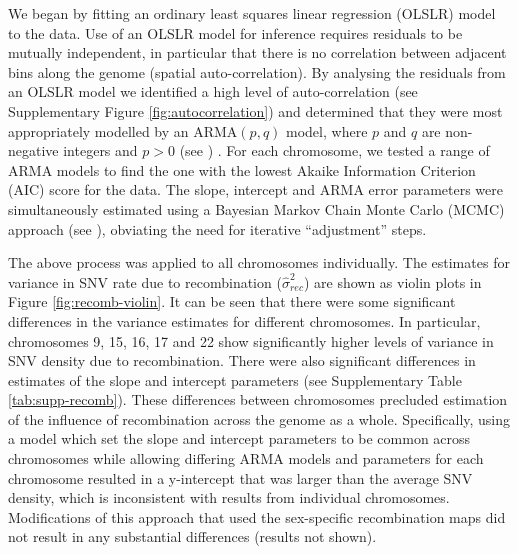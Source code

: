 We began by fitting an ordinary least squares linear regression (OLSLR) model to the data. Use of an OLSLR model for inference requires residuals to be mutually independent, in particular that there is no correlation between adjacent bins along the genome (spatial auto-correlation). By analysing the residuals from an OLSLR model we identified a high level of auto-correlation (see Supplementary Figure \ref{fig:autocorrelation}) and determined that they were most appropriately modelled by an ARMA$(p,q)$ model, where $p$ and $q$ are non-negative integers and $p>0$ (see ) . For each chromosome, we tested a range of ARMA models to find the one with the lowest Akaike Information Criterion (AIC) score for the data. The slope, intercept and ARMA error parameters were simultaneously estimated using a Bayesian Markov Chain Monte Carlo (MCMC) approach (see ), obviating the need for iterative ``adjustment'' steps. 

The above process was applied to all chromosomes individually. The estimates for variance in SNV rate due to recombination ($\hat{\sigma }^2_{rec}$) are shown as violin plots in Figure \ref{fig:recomb-violin}. It can be seen that there were some significant differences in the variance estimates for different chromosomes. In particular, chromosomes 9, 15, 16, 17 and 22 show significantly higher levels of variance in SNV density due to recombination. There were also significant differences in estimates of the slope and intercept parameters (see Supplementary Table \ref{tab:supp-recomb}). These differences between chromosomes precluded estimation of the influence of recombination across the genome as a whole. Specifically, using a model which set the slope and intercept parameters to be common across chromosomes while allowing differing ARMA models and parameters for each chromosome resulted in a y-intercept that was larger than the average SNV density, which is inconsistent with results from individual chromosomes. Modifications of this approach that used the sex-specific recombination maps did not result in any substantial differences (results not shown).

